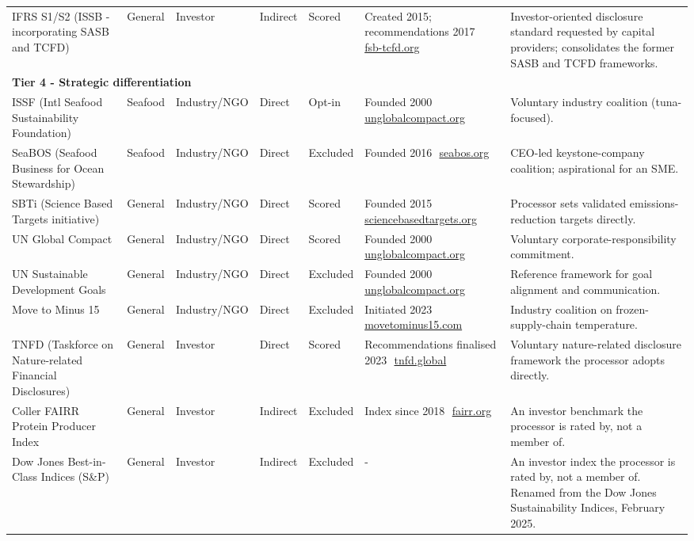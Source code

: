 \begin{landscape}
\begin{longtable}{p{2.9cm}p{1.2cm}p{1.3cm}p{1.2cm}p{1.4cm}p{3.2cm}p{5.9cm}}
IFRS S1/S2 (ISSB - incorporating SASB and TCFD) & General & Investor & Indirect & Scored & Created 2015; recommendations 2017~\,\href{https://www.fsb-tcfd.org}{fsb-tcfd.org} & Investor-oriented disclosure standard requested by capital providers; consolidates the former SASB and TCFD frameworks. \\
\multicolumn{7}{l}{\rule{0pt}{1.1em}\textbf{Tier 4 - Strategic differentiation}}\\[1pt]
ISSF (Intl Seafood Sustainability Foundation) & Seafood & Industry/NGO & Direct & Opt-in & Founded 2000~\,\href{https://unglobalcompact.org}{unglobalcompact.org} & Voluntary industry coalition (tuna-focused). \\
SeaBOS (Seafood Business for Ocean Stewardship) & Seafood & Industry/NGO & Direct & Excluded & Founded 2016~\,\href{https://seabos.org}{seabos.org} & CEO-led keystone-company coalition; aspirational for an SME. \\
SBTi (Science Based Targets initiative) & General & Industry/NGO & Direct & Scored & Founded 2015~\,\href{https://sciencebasedtargets.org}{sciencebasedtargets.org} & Processor sets validated emissions-reduction targets directly. \\
UN Global Compact & General & Industry/NGO & Direct & Scored & Founded 2000~\,\href{https://unglobalcompact.org}{unglobalcompact.org} & Voluntary corporate-responsibility commitment. \\
UN Sustainable Development Goals & General & Industry/NGO & Direct & Excluded & Founded 2000~\,\href{https://unglobalcompact.org}{unglobalcompact.org} & Reference framework for goal alignment and communication. \\
Move to Minus 15 & General & Industry/NGO & Direct & Excluded & Initiated 2023~\,\href{https://movetominus15.com}{movetominus15.com} & Industry coalition on frozen-supply-chain temperature. \\
TNFD (Taskforce on Nature-related Financial Disclosures) & General & Investor & Direct & Scored & Recommendations finalised 2023~\,\href{https://tnfd.global}{tnfd.global} & Voluntary nature-related disclosure framework the processor adopts directly. \\
Coller FAIRR Protein Producer Index & General & Investor & Indirect & Excluded & Index since 2018~\,\href{https://www.fairr.org}{fairr.org} & An investor benchmark the processor is rated by, not a member of. \\
Dow Jones Best-in-Class Indices (S\&P) & General & Investor & Indirect & Excluded & - & An investor index the processor is rated by, not a member of. Renamed from the Dow Jones Sustainability Indices, February 2025. \\
\bottomrule\end{longtable}\end{landscape}
